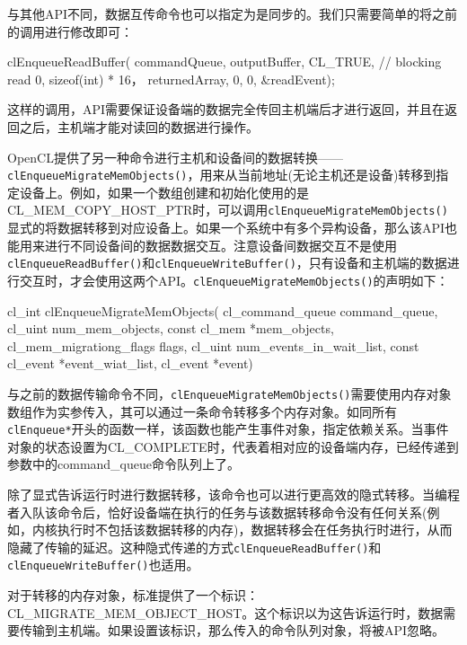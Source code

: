 与其他API不同，数据互传命令也可以指定为是同步的。我们只需要简单的将之前的调用进行修改即可：

\begin{codebox}[cpp]
clEnqueueReadBuffer(
  commandQueue,
  outputBuffer,
  CL_TRUE, // blocking read
  0,
  sizeof(int) * 16，
  returnedArray,
  0,
  0,
  &readEvent);
\end{codebox}

这样的调用，API需要保证设备端的数据完全传回主机端后才进行返回，并且在返回之后，主机端才能对读回的数据进行操作。

OpenCL提供了另一种命令进行主机和设备间的数据转换——\texttt{clEnqueueMigrateMemObjects()}，用来从当前地址(无论主机还是设备)转移到指定设备上。例如，如果一个数组创建和初始化使用的是CL\_\allowbreak{}MEM\_\allowbreak{}COPY\_\allowbreak{}HOST\_\allowbreak{}PTR时，可以调用\texttt{clEnqueueMigrateMemObjects()}显式的将数据转移到对应设备上。如果一个系统中有多个异构设备，那么该API也能用来进行不同设备间的数据数据交互。注意设备间数据交互不是使用\texttt{clEnqueueReadBuffer()}和\texttt{clEnqueueWriteBuffer()}，只有设备和主机端的数据进行交互时，才会使用这两个API。\texttt{clEnqueueMigrateMemObjects()}的声明如下：

\begin{codebox}[cpp]
cl_int
clEnqueueMigrateMemObjects(
  cl_command_queue command_queue,
  cl_uint num_mem_objects,
  const cl_mem *mem_objects,
  cl_mem_migrationg_flags flags,
  cl_uint num_events_in_wait_list,
  const cl_event *event_wiat_list,
  cl_event *event)
\end{codebox}

与之前的数据传输命令不同，\texttt{clEnqueueMigrateMemObjects()}需要使用内存对象数组作为实参传入，其可以通过一条命令转移多个内存对象。如同所有\texttt{clEnqueue*}开头的函数一样，该函数也能产生事件对象，指定依赖关系。当事件对象的状态设置为CL\_\allowbreak{}COMPLETE时，代表着相对应的设备端内存，已经传递到参数中的command\_\allowbreak{}queue命令队列上了。

除了显式告诉运行时进行数据转移，该命令也可以进行更高效的隐式转移。当编程者入队该命令后，恰好设备端在执行的任务与该数据转移命令没有任何关系(例如，内核执行时不包括该数据转移的内存)，数据转移会在任务执行时进行，从而隐藏了传输的延迟。这种隐式传递的方式\texttt{clEnqueueReadBuffer()}和\texttt{clEnqueueWriteBuffer()}也适用。

对于转移的内存对象，标准提供了一个标识：CL\_\allowbreak{}MIGRATE\_\allowbreak{}MEM\_\allowbreak{}OBJECT\_\allowbreak{}HOST。这个标识以为这告诉运行时，数据需要传输到主机端。如果设置该标识，那么传入的命令队列对象，将被API忽略。

